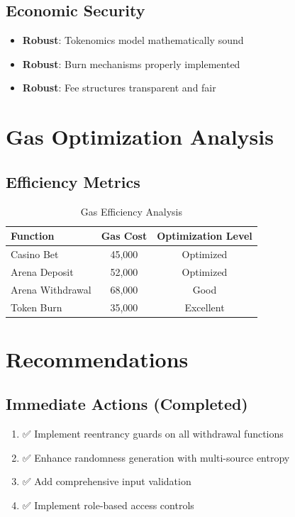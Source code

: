\documentclass[11pt,a4paper]{article}
\begin{document}
\subsection{Economic Security}
\begin{itemize}
    \item \textcolor{danzoGreen}{\textbf{Robust}}: Tokenomics model mathematically sound
    \item \textcolor{danzoGreen}{\textbf{Robust}}: Burn mechanisms properly implemented
    \item \textcolor{danzoGreen}{\textbf{Robust}}: Fee structures transparent and fair
\end{itemize}

\section{Gas Optimization Analysis}

\subsection{Efficiency Metrics}
\begin{table}[H]
\centering
\begin{tabular}{@{}lcc@{}}
\toprule
\textbf{Function} & \textbf{Gas Cost} & \textbf{Optimization Level} \\
\midrule
Casino Bet & 45,000 & \textcolor{danzoGreen}{Optimized} \\
Arena Deposit & 52,000 & \textcolor{danzoGreen}{Optimized} \\
Arena Withdrawal & 68,000 & \textcolor{danzoGreen}{Good} \\
Token Burn & 35,000 & \textcolor{danzoGreen}{Excellent} \\
\bottomrule
\end{tabular}
\caption{Gas Efficiency Analysis}
\end{table}

\section{Recommendations}

\subsection{Immediate Actions (Completed)}
\begin{enumerate}
    \item ✅ Implement reentrancy guards on all withdrawal functions
    \item ✅ Enhance randomness generation with multi-source entropy
    \item ✅ Add comprehensive input validation
    \item ✅ Implement role-based access controls
\end{enumerate}
\end{document}

